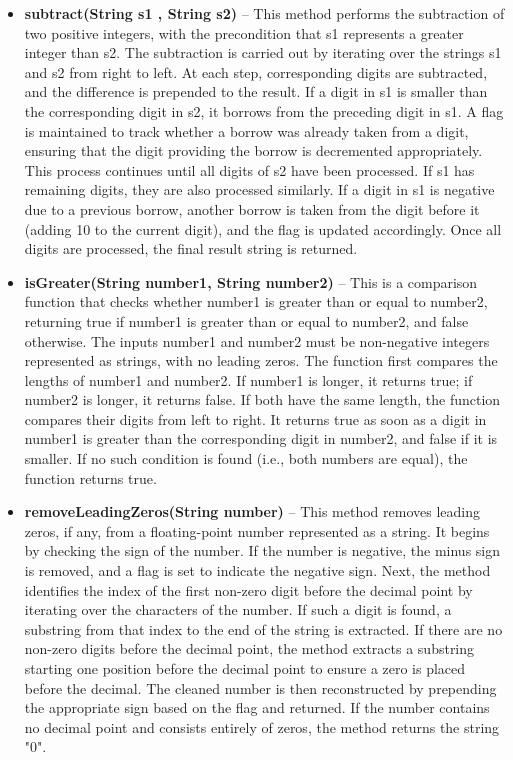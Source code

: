 \documentclass[a4paper,12pt]{article}
\begin{document}
{\begin{itemize}
    \item \textbf{subtract(String s1 , String s2)} -- This method performs the subtraction of two positive integers, with the precondition that s1 represents a greater integer than s2. The subtraction is carried out by iterating over the strings s1 and s2 from right to left. At each step, corresponding digits are subtracted, and the difference is prepended to the result. If a digit in s1 is smaller than the corresponding digit in s2, it borrows from the preceding digit in s1. A flag is maintained to track whether a borrow was already taken from a digit, ensuring that the digit providing the borrow is decremented appropriately. This process continues until all digits of s2 have been processed. If s1 has remaining digits, they are also processed similarly. If a digit in s1 is negative due to a previous borrow, another borrow is taken from the digit before it (adding 10 to the current digit), and the flag is updated accordingly. Once all digits are processed, the final result string is returned.\\

    \item \textbf{isGreater(String number1, String number2)} -- This is a comparison function that checks whether number1 is greater than or equal to number2, returning true if number1 is greater than or equal to number2, and false otherwise. The inputs number1 and number2 must be non-negative integers represented as strings, with no leading zeros. The function first compares the lengths of number1 and number2. If number1 is longer, it returns true; if number2 is longer, it returns false. If both have the same length, the function compares their digits from left to right. It returns true as soon as a digit in number1 is greater than the corresponding digit in number2, and false if it is smaller. If no such condition is found (i.e., both numbers are equal), the function returns true.\\

    \item \textbf{removeLeadingZeros(String number)} -- This method removes leading zeros, if any, from a floating-point number represented as a string. It begins by checking the sign of the number. If the number is negative, the minus sign is removed, and a flag is set to indicate the negative sign. Next, the method identifies the index of the first non-zero digit before the decimal point by iterating over the characters of the number. If such a digit is found, a substring from that index to the end of the string is extracted. If there are no non-zero digits before the decimal point, the method extracts a substring starting one position before the decimal point to ensure a zero is placed before the decimal. The cleaned number is then reconstructed by prepending the appropriate sign based on the flag and returned. If the number contains no decimal point and consists entirely of zeros, the method returns the string "0".\\


\end{itemize}}
\end{document}
